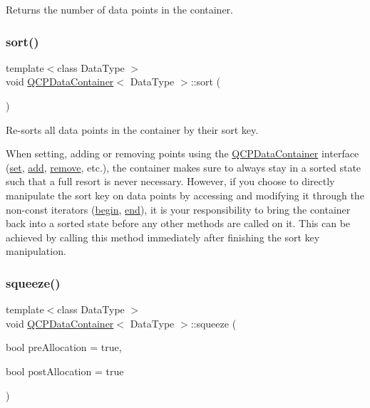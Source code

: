Returns the number of data points in the container. \mbox{\label{class_q_c_p_data_container_a75da92e33063b63d6da5014683591d45}} 
\subsubsection{\texorpdfstring{sort()}{sort()}}
{\footnotesize\ttfamily template$<$class Data\+Type $>$ \\
void \mbox{\hyperlink{class_q_c_p_data_container}{Q\+C\+P\+Data\+Container}}$<$ Data\+Type $>$\+::sort (\begin{DoxyParamCaption}{ }\end{DoxyParamCaption})}

Re-\/sorts all data points in the container by their sort key.

When setting, adding or removing points using the \mbox{\hyperlink{class_q_c_p_data_container}{Q\+C\+P\+Data\+Container}} interface (\mbox{\hyperlink{class_q_c_p_data_container_ae7042bd534fc3ce7befa2ce3f790b5bf}{set}}, \mbox{\hyperlink{class_q_c_p_data_container_a42b98bd994307ccd163a43d576f91ad9}{add}}, \mbox{\hyperlink{class_q_c_p_data_container_ae5f569a120648b167efa78835f12fd38}{remove}}, etc.), the container makes sure to always stay in a sorted state such that a full resort is never necessary. However, if you choose to directly manipulate the sort key on data points by accessing and modifying it through the non-\/const iterators (\mbox{\hyperlink{class_q_c_p_data_container_a80032518413ab8f418f7c81182fd06cb}{begin}}, \mbox{\hyperlink{class_q_c_p_data_container_acf66dfad83fe041380f5e0491e7676f2}{end}}), it is your responsibility to bring the container back into a sorted state before any other methods are called on it. This can be achieved by calling this method immediately after finishing the sort key manipulation. \mbox{\label{class_q_c_p_data_container_a82fcc511def22287fc62579d0706387c}} 
\subsubsection{\texorpdfstring{squeeze()}{squeeze()}}
{\footnotesize\ttfamily template$<$class Data\+Type $>$ \\
void \mbox{\hyperlink{class_q_c_p_data_container}{Q\+C\+P\+Data\+Container}}$<$ Data\+Type $>$\+::squeeze (\begin{DoxyParamCaption}\item[{bool}]{pre\+Allocation = {\ttfamily true},  }\item[{bool}]{post\+Allocation = {\ttfamily true} }\end{DoxyParamCaption})}

